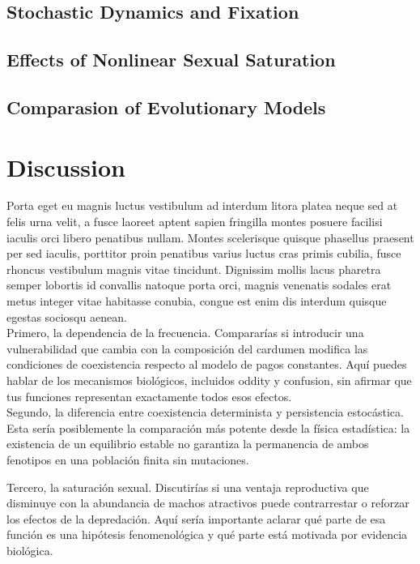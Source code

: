 \clearpage 

\subsection{Stochastic Dynamics and Fixation}

\subsection{Effects of Nonlinear Sexual Saturation}

\subsection{Comparasion of Evolutionary Models}


\section{Discussion}

Porta eget eu magnis luctus vestibulum ad interdum litora platea neque sed at felis urna velit, a fusce laoreet aptent sapien fringilla montes posuere facilisi iaculis orci libero penatibus nullam. Montes scelerisque quisque phasellus praesent per sed iaculis, porttitor proin penatibus varius luctus cras primis cubilia, fusce rhoncus vestibulum magnis vitae tincidunt. Dignissim mollis lacus pharetra semper lobortis id convallis natoque porta orci, magnis venenatis sodales erat metus integer vitae habitasse conubia, congue est enim dis interdum quisque egestas sociosqu aenean. \\ 





Primero, la dependencia de la frecuencia. Compararías si introducir una vulnerabilidad que cambia con la composición del cardumen modifica las condiciones de coexistencia respecto al modelo de pagos constantes. Aquí puedes hablar de los mecanismos biológicos, incluidos oddity y confusion, sin afirmar que tus funciones representan exactamente todos esos efectos.\\ 

Segundo, la diferencia entre coexistencia determinista y persistencia estocástica. Esta sería posiblemente la comparación más potente desde la física estadística: la existencia de un equilibrio estable no garantiza la permanencia de ambos fenotipos en una población finita sin mutaciones.

Tercero, la saturación sexual. Discutirías si una ventaja reproductiva que disminuye con la abundancia de machos atractivos puede contrarrestar o reforzar los efectos de la depredación. Aquí sería importante aclarar qué parte de esa función es una hipótesis fenomenológica y qué parte está motivada por evidencia biológica. 

